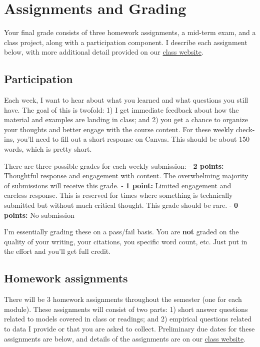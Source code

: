 \documentclass[11pt,]{article}
\begin{document}
\hypertarget{assignments-and-grading}{%
\section{Assignments and Grading}\label{assignments-and-grading}}

Your final grade consists of three homework assignments, a mid-term
exam, and a class project, along with a participation component. I
describe each assignment below, with more additional detail provided on
our \href{https://mccarthy-spring21-econ372.netlify.app/}{class
website}.

\hypertarget{participation}{%
\subsection{Participation}\label{participation}}

Each week, I want to hear about what you learned and what questions you
still have. The goal of this is twofold: 1) I get immediate feedback
about how the material and examples are landing in class; and 2) you get
a chance to organize your thoughts and better engage with the course
content. For these weekly check-ins, you'll need to fill out a short
response on Canvas. This should be about 150 words, which is pretty
short.

There are three possible grades for each weekly submission: - \textbf{2
points:} Thoughtful response and engagement with content. The
overwhelming majority of submissions will receive this grade. -
\textbf{1 point:} Limited engagement and careless response. This is
reserved for times where something is technically submitted but without
much critical thought. This grade should be rare. - \textbf{0 points:}
No submission

I'm essentially grading these on a pass/fail basis. You are \textbf{not}
graded on the quality of your writing, your citations, you specific word
count, etc. Just put in the effort and you'll get full credit.

\hypertarget{homework-assignments}{%
\subsection{Homework assignments}\label{homework-assignments}}

There will be 3 homework assignments throughout the semester (one for
each module). These assignments will consist of two parts: 1) short
answer questions related to models covered in class or readings; and 2)
empirical questions related to data I provide or that you are asked to
collect. Preliminary due dates for these assignments are below, and
details of the assignments are on our
\href{https://mccarthy-spring21-econ372.netlify.app/}{class website}.
\end{document}
